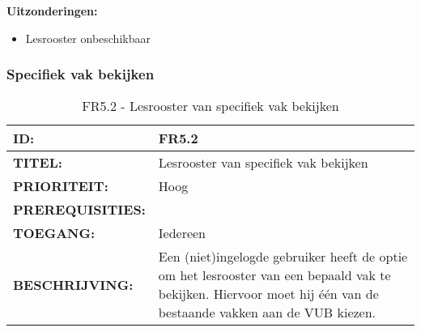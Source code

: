 \textbf{Uitzonderingen:}
\begin{itemize}
\item Lesrooster onbeschikbaar
\end{itemize}

\subsubsection{Specifiek vak bekijken}      
\noindent\begin{table}[H]
            \begin{tabular}{l | p{10cm}}
                \textbf{ID:} & FR5.2 \\ \hline
                \textbf{TITEL:} & Lesrooster van specifiek vak bekijken \\ \hline
                \textbf{PRIORITEIT:} &  Hoog \\ \hline
                \textbf{PREREQUISITIES:} & \\ \hline
                \textbf{TOEGANG:} &  Iedereen \\ \hline
                \textbf{BESCHRIJVING:} & Een (niet)ingelogde gebruiker heeft de optie om het lesrooster van een bepaald vak te bekijken. 
                                        Hiervoor moet hij \'{e}\'{e}n van de bestaande vakken aan de VUB kiezen.\\
            \end{tabular}\\
            \caption{FR5.2 - Lesrooster van specifiek vak bekijken}
            \label{tab:FR5.2 - Lesrooster van specifiek vak bekijken}
        \end{table}

